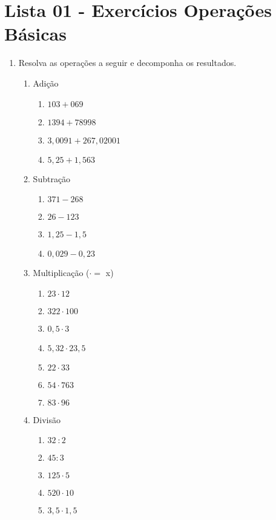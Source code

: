 \section{Lista 01 - Exercícios Operações Básicas}


\begin{enumerate}
	\item Resolva as operações a seguir e decomponha os resultados.
	
	\begin{enumerate}
		\item Adição
			\begin{enumerate}
				\item  $ 103 + 069 $
				\item  $ 1394+78998 $
				\item  $ 3,0091+267,02001$
				\item  $ 5,25 + 1,563 $
				
			\end{enumerate}
		\item Subtração
		
			\begin{enumerate}
				\item  $ 371 - 268 $
				\item  $ 26 - 123 $
				\item  $ 1,25 - 1,5$
				\item  $ 0,029 - 0,23 $
				
			\end{enumerate}
		\item Multiplicação ($ \cdot =$ x)
		
			\begin{enumerate}
				\item  $ 23 \cdot 12 $
				\item  $ 322 \cdot 100 $
				\item  $ 0,5 \cdot 3 $
				\item  $ 5,32 \cdot 23,5 $
				\item  $ 22 \cdot 33 $
				\item  $ 54 \cdot 763 $				
				\item  $ 83 \cdot 96 $
			\end{enumerate}
		
		\item Divisão
			\begin{enumerate}
				\item  $ 32 \ : 2 $
				\item  $ 45 : 3 $
				\item  $ 125 \cdot 5 $
				\item  $ 520 \cdot 10 $
				\item  $ 3,5 \cdot 1,5 $
			\end{enumerate}
	

\end{enumerate}
\end{enumerate}
